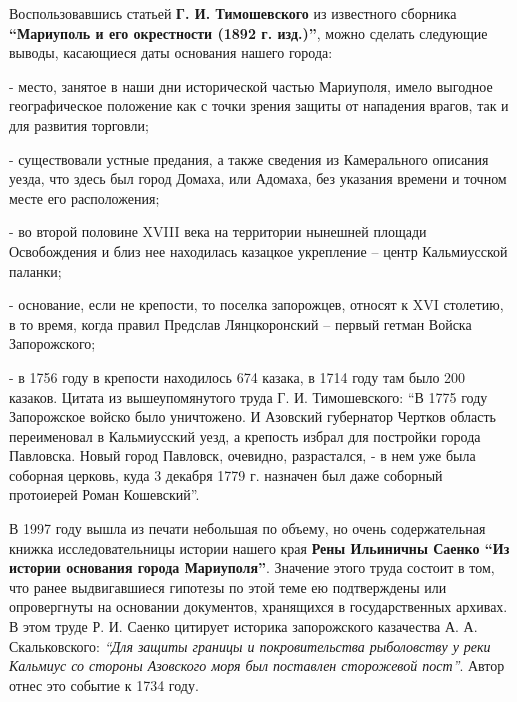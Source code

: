 Воспользовавшись статьей \textbf{Г. И. Тимошевского} из известного сборника \textbf{\enquote{Мариуполь и
его окрестности (1892 г. изд.)}}, можно сделать следующие выводы, касающиеся
даты основания нашего города:

- место, занятое в наши дни исторической частью Мариуполя, имело выгодное
географическое положение как с точки зрения защиты от нападения врагов, так и
для развития торговли;

- существовали устные предания, а также сведения из Камерального описания
уезда, что здесь был город Домаха, или Адомаха, без указания времени и точном
месте его расположения;

- во второй половине XVIII века на территории нынешней площади Освобождения и
близ нее находилась казацкое укрепление – центр Кальмиусской паланки;

- основание, если не крепости, то поселка запорожцев, относят к XVI столетию, в
то время, когда правил Предслав Лянцкоронский – первый гетман Войска
Запорожского;

- в 1756 году в крепости находилось 674 казака, в 1714 году там было 200
казаков. Цитата из вышеупомянутого труда Г. И. Тимошевского: \enquote{В 1775 году
Запорожское войско было уничтожено. И Азовский губернатор Чертков область
переименовал в Кальмиусский уезд, а крепость избрал для постройки города
Павловска. Новый город Павловск, очевидно, разрастался, - в нем уже была
соборная церковь, куда 3 декабря 1779 г. назначен был даже соборный протоиерей
Роман Кошевский}.

В 1997 году вышла из печати небольшая по объему, но очень содержательная книжка
исследовательницы истории нашего края \textbf{Рены Ильиничны Саенко \enquote{Из истории
основания города Мариуполя}}. Значение этого труда состоит в том, что ранее
выдвигавшиеся гипотезы по этой теме ею подтверждены или опровергнуты на
основании документов, хранящихся в государственных архивах. В этом труде Р. И.
Саенко цитирует историка запорожского казачества А. А. Скальковского: \emph{\enquote{Для
защиты границы и покровительства рыболовству у реки Кальмиус со стороны
Азовского моря был поставлен сторожевой пост}}. Автор отнес это событие к 1734
году.


